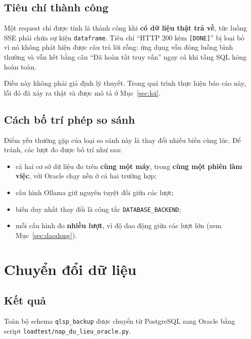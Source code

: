 \documentclass[12pt,a4paper]{article}
\newcommand{\fpath}[1]{\nolinkurl{#1}}
\begin{document}
\subsection{Tiêu chí thành công}

Một request chỉ được tính là thành công khi \textbf{có dữ liệu thật trả về},
tức luồng SSE phải chứa sự kiện \texttt{dataframe}. Tiêu chí ``HTTP 200 kèm
\texttt{[DONE]}'' bị loại bỏ vì nó không phát hiện được câu trả lời rỗng: ứng
dụng vẫn đóng luồng bình thường và vẫn kết bằng câu ``Đã hoàn tất truy vấn''
ngay cả khi tầng SQL hỏng hoàn toàn.

Điều này không phải giả định lý thuyết. Trong quá trình thực hiện báo cáo này,
lỗi đó đã xảy ra thật và được mô tả ở Mục~\ref{sec:loi}.

\subsection{Cách bố trí phép so sánh}

Điểm yếu thường gặp của loại so sánh này là thay đổi nhiều biến cùng lúc. Để
tránh, các lượt đo được bố trí như sau:

\begin{itemize}
\item cả hai cơ sở dữ liệu đo trên \textbf{cùng một máy}, trong \textbf{cùng
một phiên làm việc}, với Oracle chạy nền ở cả hai trường hợp;
\item cấu hình Ollama giữ nguyên tuyệt đối giữa các lượt;
\item biến duy nhất thay đổi là công tắc \texttt{DATABASE\_BACKEND};
\item mỗi cấu hình đo \textbf{nhiều lượt}, vì độ dao động giữa các lượt lớn
(xem Mục~\ref{sec:daodong}).
\end{itemize}

\clearpage

\section{Chuyển đổi dữ liệu}

\subsection{Kết quả}

Toàn bộ schema \texttt{qlsp\_backup} được chuyển từ PostgreSQL sang Oracle bằng
script \fpath{loadtest/nap_du_lieu_oracle.py}.
\end{document}
